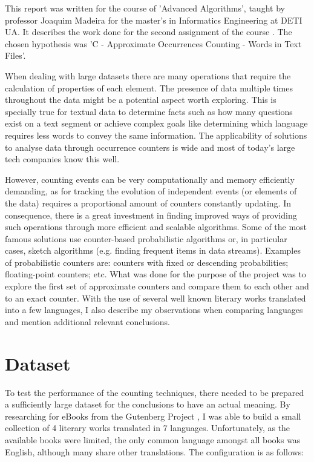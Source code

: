 \documentclass[shortpaper]{revdetua}
\begin{document}
This report was written for the course of 'Advanced Algorithms', taught by 
professor Joaquim Madeira for the master's in Informatics Engineering at DETI UA.
It describes the work done for the second assignment of the course \cite{trab2}.
The chosen hypothesis was 'C - Approximate Occurrences Counting - Words in Text Files'.

When dealing with large datasets there are many operations that require the 
calculation of properties of each element. 
The presence of data multiple times throughout the data might be a potential
aspect worth exploring.
This is specially true for textual data to determine facts such as how many 
questions exist on a text segment or achieve complex goals like determining 
which language requires less words to convey the same information.
The applicability of solutions to analyse data through occurrence counters is 
wide and most of today's large tech companies know this well.

However, counting events can be very computationally and memory efficiently 
demanding, as for tracking the evolution of independent events (or elements of 
the data) requires a proportional amount of counters constantly updating.
In consequence, there is a great investment in finding improved ways of providing 
such operations through more efficient and scalable algorithms. 
Some of the most famous solutions use counter-based probabilistic algorithms or, 
in particular cases, sketch algorithms (e.g. finding frequent items in data streams).
Examples of probabilistic counters are: counters with fixed or descending 
probabilities; floating-point counters; etc.
What was done for the purpose of the project was to explore the first set of 
approximate counters and compare them to each other and to an exact counter.
With the use of several well known literary works translated into a few languages,
I also describe my observations when comparing languages and mention additional 
relevant conclusions.


\section{Dataset}

To test the performance of the counting techniques, there needed to be prepared 
a sufficiently large dataset for the conclusions to have an actual meaning.
By researching for eBooks from the Gutenberg Project \cite{gutenberg}, I was 
able to build a small collection of 4 literary works translated in 7 languages.
Unfortunately, as the available books were limited, the only common language 
amongst all books was English, although many share other translations.
The configuration is as follows:
\end{document}
